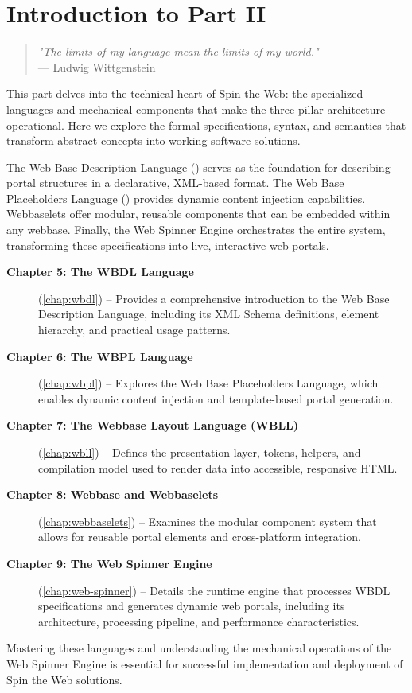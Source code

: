 
\chapter*{Introduction to Part II}
\label{part:languages}

\begin{quote}
\textit{"The limits of my language mean the limits of my world."} \\
— Ludwig Wittgenstein
\end{quote}

This part delves into the technical heart of Spin the Web: the specialized languages and mechanical components that make the three-pillar architecture operational. Here we explore the formal specifications, syntax, and semantics that transform abstract concepts into working software solutions.

The Web Base Description Language (\wbdl{}) serves as the foundation for describing portal structures in a declarative, XML-based format. The Web Base Placeholders Language (\wbpl{}) provides dynamic content injection capabilities. Webbaselets offer modular, reusable components that can be embedded within any webbase. Finally, the Web Spinner Engine orchestrates the entire system, transforming these specifications into live, interactive web portals.

\begin{description}
\item[\textbf{Chapter 5: The WBDL Language}] (\cref{chap:wbdl}) -- Provides a comprehensive introduction to the Web Base Description Language, including its XML Schema definitions, element hierarchy, and practical usage patterns.

\item[\textbf{Chapter 6: The WBPL Language}] (\cref{chap:wbpl}) -- Explores the Web Base Placeholders Language, which enables dynamic content injection and template-based portal generation.

\item[\textbf{Chapter 7: The Webbase Layout Language (WBLL)}] (\cref{chap:wbll}) -- Defines the presentation layer, tokens, helpers, and compilation model used to render data into accessible, responsive HTML.

\item[\textbf{Chapter 8: Webbase and Webbaselets}] (\cref{chap:webbaselets}) -- Examines the modular component system that allows for reusable portal elements and cross-platform integration.

\item[\textbf{Chapter 9: The Web Spinner Engine}] (\cref{chap:web-spinner}) -- Details the runtime engine that processes WBDL specifications and generates dynamic web portals, including its architecture, processing pipeline, and performance characteristics.
\end{description}

Mastering these languages and understanding the mechanical operations of the Web Spinner Engine is essential for successful implementation and deployment of Spin the Web solutions.

